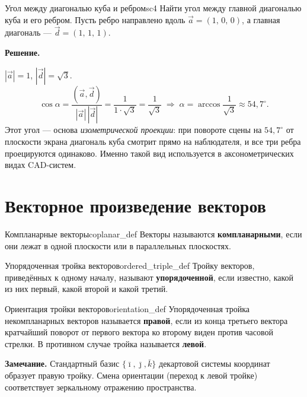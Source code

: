 \documentclass[12pt,a4paper]{article}
\newcommand{\vi}{\bar{\imath}}
\newcommand{\vj}{\bar{\jmath}}
\newcommand{\vk}{\bar{k}}
\begin{document}
\begin{exampleBox}{Угол между диагональю куба и ребром}{sc4}
  Найти угол между главной диагональю куба и его ребром.
  Пусть ребро направлено вдоль $\vec{a}=(1,\,0,\,0)$,
  а главная диагональ --- $\vec{d}=(1,\,1,\,1)$.

  \textbf{Решение.}

  $|\vec{a}|=1$, $|\vec{d}|=\sqrt{3}$.
  \[
    \cos\alpha = \frac{(\vec{a},\vec{d})}{|\vec{a}|\,|\vec{d}|}
    = \frac{1}{1\cdot\sqrt{3}}
    = \frac{1}{\sqrt{3}}
    \;\Rightarrow\;
    \alpha = \arccos\frac{1}{\sqrt{3}} \approx 54{,}7^\circ.
  \]
  Этот угол --- основа \textit{изометрической проекции}: при повороте
  сцены на $54{,}7^\circ$ от плоскости экрана диагональ куба
  смотрит прямо на наблюдателя, и все три ребра проецируются одинаково.
  Именно такой вид используется в аксонометрических видах CAD-систем.
\end{exampleBox}

\section*{Векторное произведение векторов}

\begin{definition}{Компланарные векторы}{coplanar_def}
  Векторы называются \textbf{компланарными}, если они лежат в одной
  плоскости или в параллельных плоскостях.
\end{definition}

\begin{definition}{Упорядоченная тройка векторов}{ordered_triple_def}
  Тройку векторов, приведённых к одному началу, называют
  \textbf{упорядоченной}, если известно, какой из них первый, какой второй
  и какой третий.
\end{definition}

\begin{definition}{Ориентация тройки векторов}{orientation_def}
  Упорядоченная тройка некомпланарных векторов называется \textbf{правой},
  если из конца третьего вектора кратчайший поворот от первого вектора ко
  второму виден против часовой стрелки. В противном случае тройка называется
  \textbf{левой}.
\end{definition}

\noindent
\textbf{Замечание.} Стандартный базис $\{\vi,\vj,\vk\}$ декартовой
системы координат образует правую тройку. Смена ориентации (переход
к левой тройке) соответствует зеркальному отражению пространства.
\end{document}
